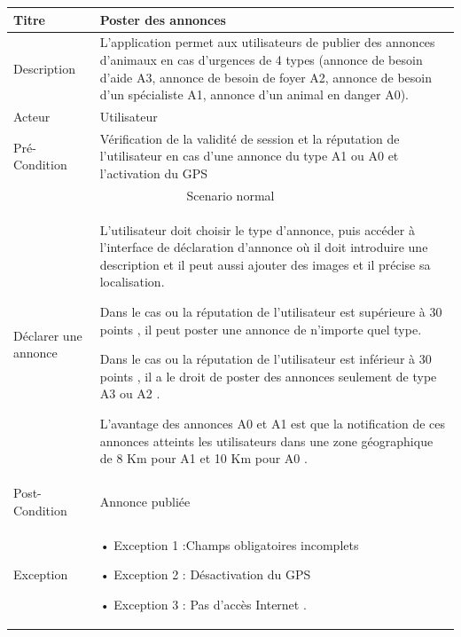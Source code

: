 \documentclass[11pt,a4paper,oneside]{book}
\begin{document}
		\begin{tabular}{ |p{3cm}|p{11cm}|  }
			
			\hline
			Titre&  Poster des annonces\\
			\hline
			Description  &L’application permet aux utilisateurs de publier des annonces d’animaux en cas d’urgences de 4 types (annonce de besoin d’aide A3, annonce de besoin de
			foyer A2, annonce de besoin d’un spécialiste A1, annonce d’un animal en danger A0).
			\\
			\hline
			Acteur&Utilisateur\\
			\hline
			Pré-Condition &Vérification de la validité de session et la réputation de l’utilisateur en cas d’une annonce du type A1 ou A0 et l’activation du GPS 
			\\
			\hline
			\multicolumn{2}{|c|}{Scenario normal} \\
			\hline
			Déclarer une annonce& 	L’utilisateur doit choisir le type d'annonce, puis accéder à l’interface de déclaration d’annonce où il doit introduire une description et il peut aussi ajouter des images et il précise sa localisation.
			
			
			\vspace{5mm} %
			Dans le cas ou la réputation de l’utilisateur est supérieure à 30 points , il peut poster une annonce de n’importe quel type.
			
			
			\vspace{5mm} %
			Dans le cas ou la réputation de l’utilisateur est inférieur à 30 points , il a le droit de poster des annonces seulement de type A3 ou A2 .
			
			
			\vspace{5mm} %
			L’avantage des annonces A0 et A1 est que la notification de ces annonces atteints les utilisateurs dans une zone géographique de 8 Km pour A1 et 10 Km pour A0 .
			\\
			
			\hline
			Post-Condition& Annonce publiée\\
			\hline
			Exception&  • Exception 1 :Champs obligatoires incomplets 
			
			• Exception 2 : Désactivation du GPS
			
			
			• Exception 3 : Pas d'accès Internet .\\
			\hline
		\end{tabular}
\end{document}
